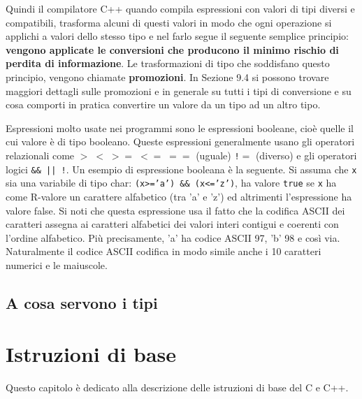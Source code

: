 \documentclass[a4paper,12pt]{book}
\begin{document}
Quindi il compilatore C++ quando compila espressioni con valori di tipi diversi e compatibili, trasforma alcuni di questi valori in modo che ogni operazione si applichi a valori dello stesso tipo e nel farlo segue il seguente semplice principio: \textbf{vengono applicate le conversioni che producono il minimo rischio di perdita di informazione}.
Le trasformazioni di tipo che soddisfano questo principio, vengono chiamate \textbf{promozioni}.
In Sezione 9.4 si possono trovare maggiori dettagli sulle promozioni e in generale su tutti i tipi di conversione e su cosa comporti in pratica convertire un valore da un tipo ad un altro tipo. 

Espressioni molto usate nei programmi sono le espressioni booleane, cioè quelle il cui valore è di tipo booleano.
Queste espressioni generalmente usano gli operatori relazionali come \texttt{$> \; < \; >= \; <= \; ==$} (uguale) \texttt{!$=$} (diverso) e gli operatori logici \texttt{\&\& || !}.
Un esempio di espressione booleana è la seguente.
Si assuma che \texttt{x} sia una variabile di tipo char: \texttt{(x>='a') \&\& (x<='z')}, ha valore \texttt{true} se \texttt{x} ha come R-valore un carattere alfabetico (tra 'a' e 'z') ed altrimenti l'espressione ha valore false.
Si noti che questa espressione usa il fatto che la codifica ASCII dei caratteri assegna ai caratteri alfabetici dei valori interi contigui e coerenti con l'ordine alfabetico.
Più precisamente, 'a' ha codice ASCII 97, 'b' 98 e così via.
Naturalmente il codice ASCII codifica in modo simile anche i 10 caratteri numerici e le maiuscole. 











\section{A cosa servono i tipi}














\chapter{Istruzioni di base}
Questo capitolo è dedicato alla descrizione delle istruzioni di base del C e C++.
\end{document}
